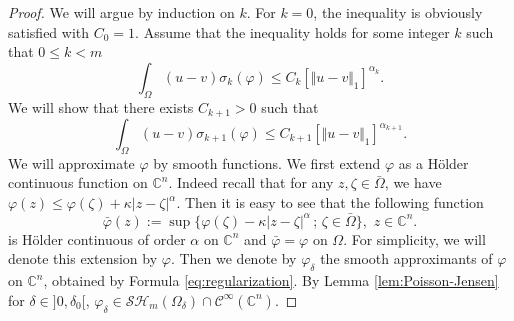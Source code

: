 \documentclass[JEP,XML,SOM,Unicode]{cedram}
\newcommand{\sep}{\,;\,}
\theoremstyle{definition}
\renewcommand{\C}{\mathbb{C}}
\newcommand{\Cc}{\mathcal{C}}
\begin{document}
\begin{proof}
We will argue by induction on $k$. For $k=0$, the inequality is obviously satisfied with $C_0 = 1$. Assume that the inequality holds for some integer $k$ such that $0 \leq k<m$ \ie
\begin{equation}\label{eq:Hyprec}
\int_{\Omega}( u-v) \sigma_k{(\varphi)}\leq C_{k} \left[\Vert u-v \Vert_1\right]^{\alpha_k}.
\end{equation}
We will show that there exists $C_{k+1} > 0$ such that
\[
\int_{\Omega}(u-v) \sigma_{k+1}(\varphi)\leq C_{k+1} \left[\Vert u-v \Vert_1\right]^{\alpha_{k+1}}.
\]
We will approximate $\varphi$ by smooth functions. We first extend $\varphi$ as a Hölder continuous function on $\C^n$. Indeed recall that for any $z, \zeta \in \bar{\Omega}$, we have $\varphi (z) \leq \varphi (\zeta) + \kappa \vert z - \zeta\vert^\alpha $. Then it is easy to see that the following function
\begin{equation} \label{eq:Holderextension}
\bar{\varphi} (z):= \sup \{\varphi (\zeta) - \kappa \vert z - \zeta\vert^\alpha \sep \zeta \in \bar{\Omega}\}, \, \, z \in \C^n.
\end{equation}
is Hölder continuous of order $\alpha$ on $\C^n$ and $ \bar{\varphi} = \varphi$ on $\Omega$. For simplicity, we will denote this extension by $\varphi$. Then we denote by $\varphi_{\delta}$ the smooth approximants of $\varphi $ on $\C^n$, obtained by Formula \eqref{eq:regularization}. By Lemma \ref{lem:Poisson-Jensen} for $\delta\in{}]0,\delta_0[$, $\varphi_\delta \in \mathcal{SH}_m (\Omega_{\delta})\cap\Cc^{\infty}(\C^n)$.


\end{proof}
\end{document}
